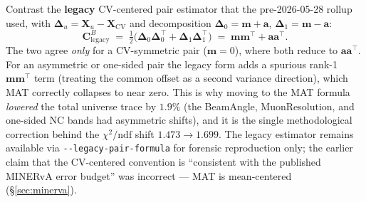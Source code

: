 \documentclass[12pt]{article}
\newcommand{\CV}{\text{CV}}
\newcommand{\T}{^{\!\top}}
\begin{document}
Contrast the \textbf{legacy} CV-centered pair estimator that the
pre-2026-05-28 rollup used, with $\boldsymbol{\Delta}_{u} =
\mathbf{X}_{u}-\mathbf{X}_{\CV}$ and decomposition
$\boldsymbol{\Delta}_{0}=\mathbf{m}+\mathbf{a}$,
$\boldsymbol{\Delta}_{1}=\mathbf{m}-\mathbf{a}$:
\begin{equation}
\mathbf{C}^{B}_{\text{legacy}}
\;=\;
\tfrac{1}{2}\big(\boldsymbol{\Delta}_{0}\boldsymbol{\Delta}_{0}\T
                + \boldsymbol{\Delta}_{1}\boldsymbol{\Delta}_{1}\T\big)
\;=\;
\mathbf{m}\mathbf{m}\T + \mathbf{a}\mathbf{a}\T.
\end{equation}
The two agree \emph{only} for a CV-symmetric pair ($\mathbf{m}=0$),
where both reduce to $\mathbf{a}\mathbf{a}\T$. For an asymmetric or
one-sided pair the legacy form adds a spurious rank-1
$\mathbf{m}\mathbf{m}\T$ term (treating the common offset as a second
variance direction), which MAT correctly collapses to near zero. This
is why moving to the MAT formula \emph{lowered} the total universe
trace by $1.9\%$ (the BeamAngle, MuonResolution, and one-sided NC
bands had asymmetric shifts), and it is the single methodological
correction behind the $\chi^{2}/\mathrm{ndf}$ shift $1.473\to1.699$.
The legacy estimator remains available via
\texttt{-{}-legacy-pair-formula} for forensic reproduction only; the
earlier claim that the CV-centered convention is ``consistent with the
published MINERvA error budget'' was incorrect --- MAT is mean-centered
(\S\ref{sec:minerva}).
\end{document}
